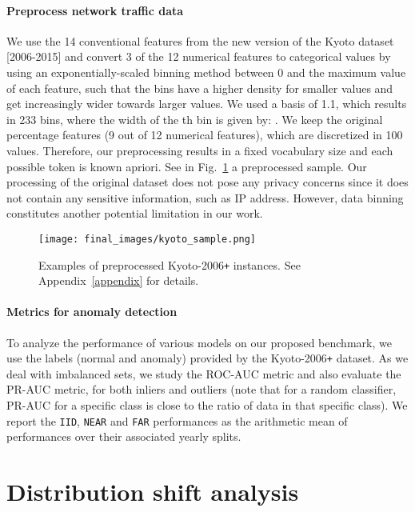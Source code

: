 \documentclass{article}
\begin{document}
    \paragraph{Preprocess network traffic data} We use the 14 conventional features from the new version of the Kyoto dataset [2006-2015] and convert 3 of the 12 numerical features to categorical values by using an exponentially-scaled binning method between 0 and the maximum value of each feature, such that the bins have a higher density for smaller values and get increasingly wider towards larger values. We used a basis of 1.1, which results in 233 bins, where the width of the th bin is given by: . We keep the original percentage features (9 out of 12 numerical features), which are discretized in 100 values. Therefore, our preprocessing results in a fixed vocabulary size and each possible token is known apriori. See in Fig.~\ref{fig:kyoto_instance} a preprocessed sample. Our processing of the original dataset does not pose any privacy concerns since it does not contain any sensitive information, such as IP address. However, data binning constitutes another potential limitation in our work.
    
\begin{figure}[t]
    \begin{center}
        \texttt{[image: final\_images/kyoto\_sample.png]}
    \end{center}
    \caption{Examples of preprocessed Kyoto-2006\texttt{+} instances. See Appendix~\ref{appendix} for details.}
    \label{fig:kyoto_instance}
\end{figure}

    \paragraph{Metrics for anomaly detection} To analyze the performance of various models on our proposed benchmark, we use the labels (normal and anomaly) provided by the Kyoto-2006\texttt{+} dataset. As we deal with imbalanced sets, we study the ROC-AUC metric and also evaluate the PR-AUC metric, for both inliers and outliers (note that for a random classifier, PR-AUC for a specific class is close to the ratio of data in that specific class). We report the \texttt{IID}, \texttt{NEAR} and \texttt{FAR} performances as the arithmetic mean of performances over their associated yearly splits.
    




\section{Distribution shift analysis}\label{sec:distrib_shift_analysis}
\end{document}
